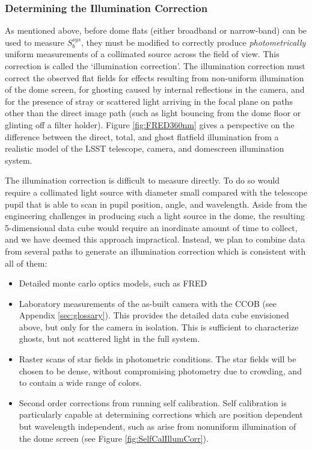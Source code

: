 \documentclass[12pt,preprint]{aastex}
\begin{document}
\subsubsection{Determining the Illumination Correction}
\label{sec:ic}
As mentioned above, before dome flats (either
broadband or narrow-band) can be used to measure
$S_b^{sys}$, they must be modified to correctly produce {\it
photometrically} uniform measurements of a collimated source 
across the field of view. This correction is called the
`illumination correction'.  The illumination correction must correct
the observed flat fields for effects resulting from non-uniform
illumination of the dome screen, for ghosting caused by internal
reflections in the camera, and for the presence of stray or scattered
light arriving in the focal plane on paths other than the direct
image path (such as light bouncing from the dome floor or glinting
off a filter holder). Figure \ref{fig:FRED360nm} gives a perspective
on the difference between the direct, total, and ghost flatfield 
illumination from a realistic model of the LSST telescope, camera,
and domescreen illumination system.

The illumination correction is difficult to measure directly.  To
do so would require a collimated light source with diameter small compared 
with the telescope pupil that is able to scan in pupil position, angle,
and wavelength.  Aside from the engineering challenges in producing such
a light source in the dome, the resulting 5-dimensional data cube would require
an inordinate amount of time to collect, and we have deemed this approach 
impractical.  Instead, we plan to combine data from several paths to generate
an illumination correction which is consistent with all of them:

\begin{itemize}
\item Detailed monte carlo optics models, such as FRED
\item {Laboratory measurements of the as-built camera with the CCOB (see Appendix \ref{sec:glossary}).  This provides
the detailed data cube envisioned above, but only for the camera in isolation.  This is sufficient to
characterize ghosts, but not scattered light in the full system.}
\item {Raster scans of star fields in photometric conditions.  The star fields will be chosen
to be dense, without compromising photometry due to crowding, and to contain a wide range of colors.}
\item {Second order corrections from running self calibration.  Self calibration is particularly capable
at determining corrections which are position dependent but wavelength independent, such as 
arise from nonuniform illumination of the dome screen (see Figure \ref{fig:SelfCalIllumCorr}).}
\end{itemize}
\end{document}
